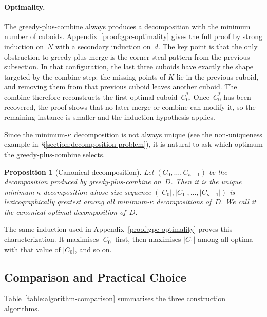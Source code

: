 \documentclass[manuscript,screen,review]{acmart}
\theoremstyle{definition}
\theoremstyle{plain}
\newtheorem{proposition}{Proposition}
\begin{document}
\paragraph{Optimality.}
The greedy-plus-combine always produces a decomposition with the minimum number of cuboids.
Appendix~\ref{proof:gpc-optimality} gives the full proof by strong induction on~$N$ with a secondary induction on~$d$. The key point is that the only obstruction to greedy-plus-merge is the corner-steal pattern from the previous subsection. In that configuration, the last three cuboids have exactly the shape targeted by the combine step: the missing points of $K$ lie in the previous cuboid, and removing them from that previous cuboid leaves another cuboid. The combine therefore reconstructs the first optimal cuboid~$C^*_0$. Once~$C^*_0$ has been recovered, the proof shows that no later merge or combine can modify it, so the remaining instance is smaller and the induction hypothesis applies.

Since the minimum-$\kappa$ decomposition is not always unique (see the
non-uniqueness example in~\S\ref{section:decomposition-problem}), it is
natural to ask which optimum the greedy-plus-combine selects.

\begin{proposition}[Canonical decomposition]
\label{proposition:canonical-decomposition}
Let $(C_0, \ldots, C_{\kappa-1})$ be the decomposition produced by
greedy-plus-combine on~$D$. Then it is the unique minimum-$\kappa$
decomposition whose size sequence
$(|C_0|, |C_1|, \ldots, |C_{\kappa-1}|)$ is lexicographically
greatest among all minimum-$\kappa$ decompositions of~$D$.
We call it the \emph{canonical} optimal decomposition of~$D$.
\end{proposition}

The same induction used in Appendix~\ref{proof:gpc-optimality} proves
this characterization. It maximises $|C_0|$ first, then maximises
$|C_1|$ among all optima with that value of $|C_0|$, and so on.

\subsection{Comparison and Practical Choice}

Table~\ref{table:algorithm-comparison} summarises the three construction algorithms.
\end{document}
